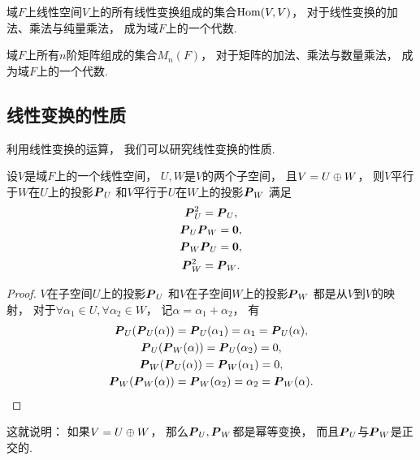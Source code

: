 \begin{example}
域\(F\)上线性空间\(V\)上的所有线性变换组成的集合\(\operatorname{Hom}(V,V)\)，
对于线性变换的加法、乘法与纯量乘法，
成为域\(F\)上的一个代数.
\end{example}

\begin{example}
域\(F\)上所有\(n\)阶矩阵组成的集合\(M_n(F)\)，
对于矩阵的加法、乘法与数量乘法，
成为域\(F\)上的一个代数.
\end{example}

\subsection{线性变换的性质}
利用线性变换的运算，
我们可以研究线性变换的性质.

\begin{proposition}
设\(V\)是域\(F\)上的一个线性空间，
\(U,W\)是\(V\)的两个子空间，
且\(V=U \oplus W\)，
则\(V\)平行于\(W\)在\(U\)上的投影\(\boldsymbol{P}_U\)
和\(V\)平行于\(U\)在\(W\)上的投影\(\boldsymbol{P}_W\)
满足\begin{gather*}
	\boldsymbol{P}_U^2
	=\boldsymbol{P}_U, \\
	\boldsymbol{P}_U \boldsymbol{P}_W
	=\boldsymbol0, \\
	\boldsymbol{P}_W \boldsymbol{P}_U
	=\boldsymbol0, \\
	\boldsymbol{P}_W^2
	=\boldsymbol{P}_W.
\end{gather*}
\begin{proof}
\(V\)在子空间\(U\)上的投影\(\boldsymbol{P}_U\)
和\(V\)在子空间\(W\)上的投影\(\boldsymbol{P}_W\)
都是从\(V\)到\(V\)的映射，
对于\(\forall\alpha_1\in U,
\forall\alpha_2\in W\)，
记\(\alpha=\alpha_1+\alpha_2\)，
有\begin{gather*}
	\boldsymbol{P}_U(\boldsymbol{P}_U(\alpha))
	=\boldsymbol{P}_U(\alpha_1)
	=\alpha_1
	=\boldsymbol{P}_U(\alpha), \\
	\boldsymbol{P}_U(\boldsymbol{P}_W(\alpha))
	=\boldsymbol{P}_U(\alpha_2)
	=0, \\
	\boldsymbol{P}_W(\boldsymbol{P}_U(\alpha))
	=\boldsymbol{P}_W(\alpha_1)
	=0, \\
	\boldsymbol{P}_W(\boldsymbol{P}_W(\alpha))
	=\boldsymbol{P}_W(\alpha_2)
	=\alpha_2
	=\boldsymbol{P}_W(\alpha).
	\qedhere
\end{gather*}
\end{proof}
\end{proposition}
\begin{remark}
这就说明：
如果\(V = U \oplus W\)，
那么\(\boldsymbol{P}_U,\boldsymbol{P}_W\)都是幂等变换，
而且\(\boldsymbol{P}_U\)与\(\boldsymbol{P}_W\)是正交的.
\end{remark}

